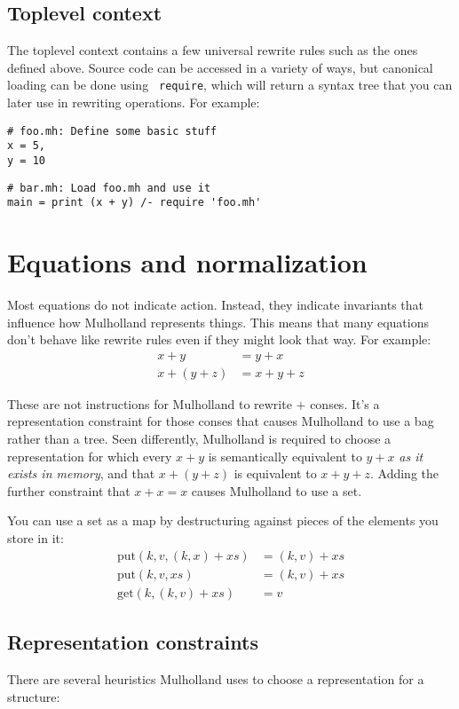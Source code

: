 \documentclass{report}
\begin{document}
\section{Toplevel context}
    The toplevel context contains a few universal rewrite rules such as the ones defined above. Source code can be accessed in a variety of ways, but canonical loading can be done using {\tt
    require}, which will return a syntax tree that you can later use in rewriting operations. For example:
\begin{verbatim}
# foo.mh: Define some basic stuff
x = 5,
y = 10
\end{verbatim}

\begin{verbatim}
# bar.mh: Load foo.mh and use it
main = print (x + y) /- require 'foo.mh'
\end{verbatim}

\chapter{Equations and normalization}
  Most equations do not indicate action. Instead, they indicate invariants that influence how Mulholland represents things. This means that many equations don't behave like rewrite rules even
  if they might look that way. For example:
\begin{align*}
x + y       & = y + x \\
x + (y + z) & = x + y + z
\end{align*}

  These are not instructions for Mulholland to rewrite $+$ conses. It's a representation constraint for those conses that causes Mulholland to use a bag rather than a tree. Seen differently,
  Mulholland is required to choose a representation for which every $x + y$ is semantically equivalent to $y + x$ {\em as it exists in memory}, and that $x + (y + z)$ is equivalent to $x + y +
  z$. Adding the further constraint that $x + x = x$ causes Mulholland to use a set.

  You can use a set as a map by destructuring against pieces of the elements you store in it:
\begin{align*}
\textrm{put}(k, v, (k, x) + xs) & = (k, v) + xs \\
\textrm{put}(k, v, xs)          & = (k, v) + xs \\
\textrm{get}(k, (k, v) + xs)    & = v
\end{align*}

\section{Representation constraints}
    There are several heuristics Mulholland uses to choose a representation for a structure:
\end{document}
